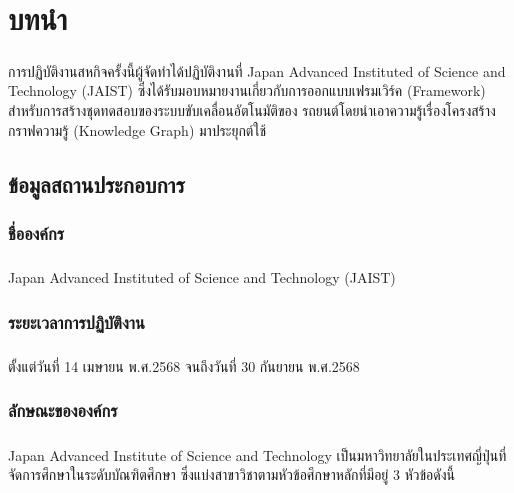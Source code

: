 \chapter{บทนำ}\label{ch:introduction}

\paragraph{}{\sloppy การปฏิบัติงานสหกิจครั้งนี้ผู้จัดทำได้ปฏิบัติงานที่ Japan Advanced Instituted of Science and Technology (JAIST) ซึ่งได้รับมอบหมายงานเกี่ยวกับการออกแบบเฟรมเวิร์ค (Framework) สำหรับการสร้างชุดทดสอบของระบบขับเคลื่อนอัตโนมัติของ รถยนต์โดยนำเอาความรู้เรื่องโครงสร้างกราฟความรู้ (Knowledge Graph) มาประยุกต์ใช้ \par}

\section{ข้อมูลสถานประกอบการ}\label{sec:company-info}

\subsection{ชื่อองค์กร}\label{subsec:company-name}
\paragraph{}Japan Advanced Instituted of Science and Technology (JAIST)

\subsection{ระยะเวลาการปฏิบัติงาน}\label{subsec:duration}
\paragraph{}ตั้งแต่วันที่ 14 เมษายน พ.ศ.2568 จนถึงวันที่ 30 กันยายน พ.ศ.2568

\subsection{ลักษณะขององค์กร}\label{subsec:company-type}
\paragraph{}Japan Advanced Institute of Science and Technology เป็นมหาวิทยาลัยในประเทศญี่ปุ่นที่จัดการศึกษาในระดับบัณฑิตศึกษา ซึ่งแบ่งสาขาวิชาตามหัวข้อศึกษาหลักที่มีอยู่ 3 หัวข้อดังนี้


